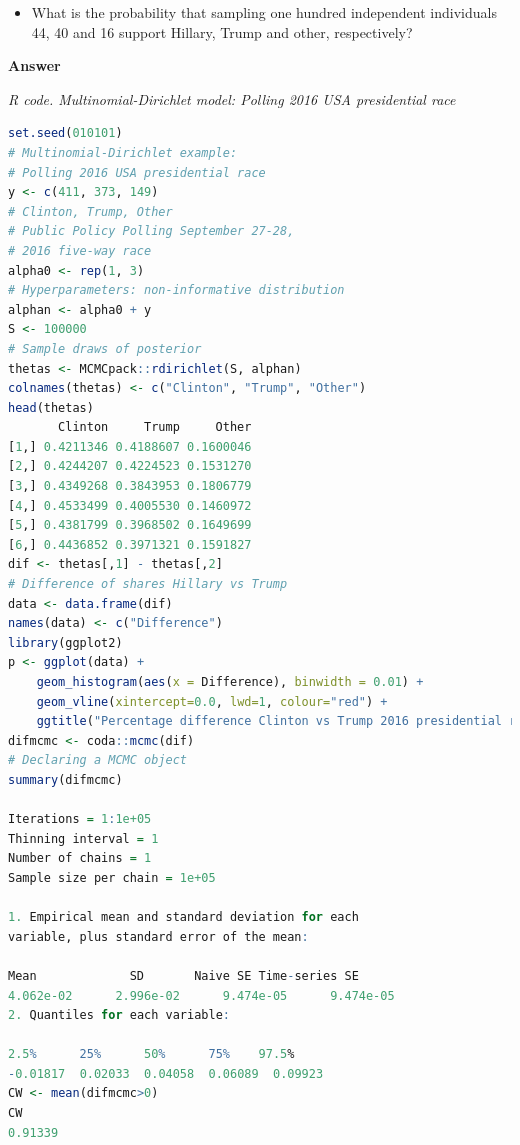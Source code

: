 \begin{enumerate}[leftmargin=*]
\begin{itemize}
	\item What is the probability that sampling one hundred independent individuals 44, 40 and 16 support Hillary, Trump and other, respectively?  
\end{itemize}

\textbf{Answer}

\begin{tcolorbox}[enhanced,width=4.67in,center upper,
	fontupper=\large\bfseries,drop shadow southwest,sharp corners]
	\textit{R code. Multinomial-Dirichlet model: Polling 2016 USA presidential race}
\begin{VF}
\begin{lstlisting}[language=R]
set.seed(010101)
# Multinomial-Dirichlet example: 
# Polling 2016 USA presidential race
y <- c(411, 373, 149) 
# Clinton, Trump, Other
# Public Policy Polling September 27-28, 
# 2016 five-way race
alpha0 <- rep(1, 3)
# Hyperparameters: non-informative distribution
alphan <- alpha0 + y 
S <- 100000 
# Sample draws of posterior
thetas <- MCMCpack::rdirichlet(S, alphan)
colnames(thetas) <- c("Clinton", "Trump", "Other")
head(thetas)
       Clinton     Trump     Other
[1,] 0.4211346 0.4188607 0.1600046
[2,] 0.4244207 0.4224523 0.1531270
[3,] 0.4349268 0.3843953 0.1806779
[4,] 0.4533499 0.4005530 0.1460972
[5,] 0.4381799 0.3968502 0.1649699
[6,] 0.4436852 0.3971321 0.1591827
dif <- thetas[,1] - thetas[,2]
# Difference of shares Hillary vs Trump
data <- data.frame(dif)
names(data) <- c("Difference")
library(ggplot2)
p <- ggplot(data) +  
	geom_histogram(aes(x = Difference), binwidth = 0.01) +
	geom_vline(xintercept=0.0, lwd=1, colour="red") + 
	ggtitle("Percentage difference Clinton vs Trump 2016 presidential race") + xlab("Percentage Difference") + ylab("")
difmcmc <- coda::mcmc(dif)
# Declaring a MCMC object
summary(difmcmc)

Iterations = 1:1e+05
Thinning interval = 1 
Number of chains = 1 
Sample size per chain = 1e+05 

1. Empirical mean and standard deviation for each 
variable, plus standard error of the mean:

Mean             SD       Naive SE Time-series SE 
4.062e-02      2.996e-02      9.474e-05      9.474e-05 
2. Quantiles for each variable:

2.5%      25%      50%      75%    97.5% 
-0.01817  0.02033  0.04058  0.06089  0.09923 
CW <- mean(difmcmc>0)
CW
0.91339
\end{lstlisting}
\end{VF}
\end{tcolorbox} 


\end{enumerate}
